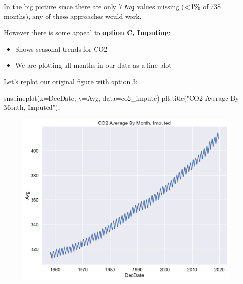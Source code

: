 \documentclass[
  letterpaper,
  DIV=11,
  numbers=noendperiod]{scrreprt}
\newenvironment{Shaded}{\begin{snugshade}}{\end{snugshade}}
\newcommand{\NormalTok}[1]{\textcolor[rgb]{0.00,0.23,0.31}{#1}}
\newcommand{\OperatorTok}[1]{\textcolor[rgb]{0.37,0.37,0.37}{#1}}
\newcommand{\StringTok}[1]{\textcolor[rgb]{0.13,0.47,0.30}{#1}}
\providecommand{\tightlist}{%
  \setlength{\itemsep}{0pt}\setlength{\parskip}{0pt}}\usepackage{longtable,booktabs,array}
\begin{document}
In the big picture since there are only 7 \texttt{Avg} values missing
(\textbf{\textless1\%} of 738 months), any of these approaches would
work.

However there is some appeal to \textbf{option C, Imputing}:

\begin{itemize}
\tightlist
\item
  Shows seasonal trends for CO2
\item
  We are plotting all months in our data as a line plot
\end{itemize}

Let's replot our original figure with option 3:

\begin{Shaded}
\begin{Highlighting}[]
\NormalTok{sns.lineplot(x}\OperatorTok{=}\StringTok{\textquotesingle{}DecDate\textquotesingle{}}\NormalTok{, y}\OperatorTok{=}\StringTok{\textquotesingle{}Avg\textquotesingle{}}\NormalTok{, data}\OperatorTok{=}\NormalTok{co2\_impute)}
\NormalTok{plt.title(}\StringTok{"CO2 Average By Month, Imputed"}\NormalTok{)}\OperatorTok{;}
\end{Highlighting}
\end{Shaded}

\begin{figure}[H]

{\centering \includegraphics{eda/eda_files/figure-pdf/cell-76-output-1.pdf}

}

\end{figure}
\end{document}
